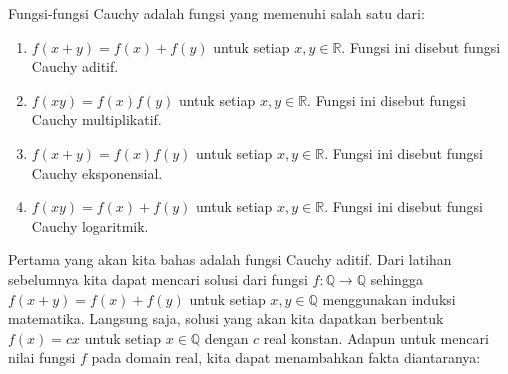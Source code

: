 \documentclass{article}
\begin{document}
Fungsi-fungsi Cauchy adalah fungsi yang memenuhi salah satu dari:
\begin{enumerate}
\item $f(x+y) = f(x)+f(y)$ untuk setiap $x, y \in \mathbb{R}$. Fungsi ini disebut fungsi Cauchy aditif.
\item $f(xy) = f(x)f(y)$ untuk setiap $x, y \in \mathbb{R}$. Fungsi ini disebut fungsi Cauchy multiplikatif.
\item $f(x+y) = f(x)f(y)$ untuk setiap $x, y \in \mathbb{R}$. Fungsi ini disebut fungsi Cauchy eksponensial.
\item $f(xy) = f(x)+f(y)$ untuk setiap $x, y \in \mathbb{R}$. Fungsi ini disebut fungsi Cauchy logaritmik.
\end{enumerate}

Pertama yang akan kita bahas adalah fungsi Cauchy aditif. Dari latihan sebelumnya kita dapat mencari solusi dari fungsi $f : \mathbb{Q} \rightarrow \mathbb{Q}$ sehingga $f(x+y) = f(x)+f(y)$ untuk setiap $x, y \in \mathbb{Q}$ menggunakan induksi matematika. Langsung saja, solusi yang akan kita dapatkan berbentuk $f(x) = cx$ untuk setiap $x \in \mathbb{Q}$ dengan $c$ real konstan. Adapun untuk mencari nilai fungsi $f$ pada domain real, kita dapat menambahkan fakta diantaranya:
\end{document}
